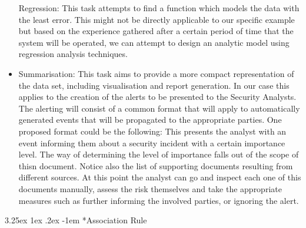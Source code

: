 \documentclass[12pt]{article}
\makeatletter
\newcounter{subsubsubsection}[subsubsection]
\renewcommand\paragraph{\@startsection{paragraph}{5}{\z@}%
  {3.25ex \@plus1ex \@minus.2ex}%
  {-1em}%
  {\normalfont\normalsize\bfseries}}
\makeatother
\begin{document}
\begin{itemize}
Regression: This task attempts to find a function which models the data with the least error.
This might not be directly applicable to our specific example but based on the experience
gathered after a certain period of time that the system will be operated, we can attempt to
design an analytic model using regression analysis techniques.
\item
Summarisation: This task aims to provide a more compact representation of the data set,
including visualisation and report generation. In our case this applies to the creation of the
alerts to be presented to the Security Analysts. The alerting will consist of a common format
that will apply to automatically generated events that will be propagated to the appropriate
parties. One proposed format could be the following:
This presents the analyst with an event informing them about a security incident with a certain importance level. The way of determining the level of importance falls out of the scope of thisn document. Notice also the list of supporting documents resulting from different sources. At this point the analyst can go and inspect each one of this documents manually, assess the risk themselves and take the appropriate measures such as further informing the involved parties, or ignoring the alert.
\end{itemize}
\paragraph*{Association Rule}
\end{document}
